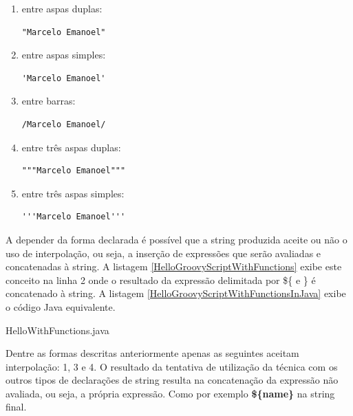 \documentclass[12pt]{article}
\begin{document}
    \begin{enumerate}
        \item entre aspas duplas: 
            \begin{lstlisting}[style=InlineGroovy]
                "Marcelo Emanoel"
            \end{lstlisting}
        \item entre aspas simples:
            \begin{lstlisting}[style=InlineGroovy]
                'Marcelo Emanoel'
            \end{lstlisting}
        \item entre barras:
            \begin{lstlisting}[style=InlineGroovy]
                /Marcelo Emanoel/
            \end{lstlisting}
        \item entre três aspas duplas: 
            \begin{lstlisting}[style=InlineGroovy]
                """Marcelo Emanoel"""
            \end{lstlisting}
        \item entre três aspas simples:
            \begin{lstlisting}[style=InlineGroovy]
                '''Marcelo Emanoel'''
            \end{lstlisting}

    \end{enumerate}
    
    A depender da forma declarada é possível que a string produzida aceite ou não
    o uso de interpolação, ou seja, a inserção de expressões que serão avaliadas
    e concatenadas à string. A listagem \ref{HelloGroovyScriptWithFunctions} exibe
    este conceito na linha 2 onde o resultado da expressão delimitada por \$\{ e \}
    é concatenado à string. A listagem \ref{HelloGroovyScriptWithFunctionsInJava}
    exibe o código Java equivalente.
    
    
                    {HelloWithFunctions.java}

    Dentre as formas descritas anteriormente apenas as seguintes aceitam 
    interpolação: 1, 3 e 4. O resultado da tentativa de utilização da técnica com
    os outros tipos de declarações de string resulta na concatenação da expressão
    não avaliada, ou seja, a própria expressão. Como por exemplo \textbf{\$\{name\}}
    na string final. 
\end{document}
